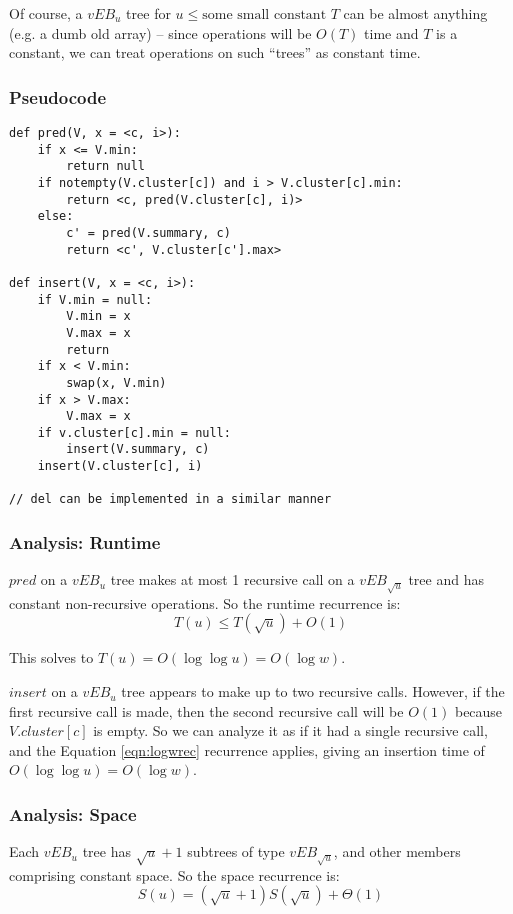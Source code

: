 \documentclass[11pt]{article}
\begin{document}
Of course, a $vEB_u$ tree for $u \leq \text{some small constant } T$ can be almost anything (e.g. a dumb old array) -- since operations will be $O(T)$ time and $T$ is a constant, we can treat operations on such ``trees'' as constant time.

\subsubsection{Pseudocode}
\small
\begin{verbatim}
def pred(V, x = <c, i>):
    if x <= V.min:
        return null
    if notempty(V.cluster[c]) and i > V.cluster[c].min:
        return <c, pred(V.cluster[c], i)>
    else:
        c' = pred(V.summary, c)
        return <c', V.cluster[c'].max>
        
def insert(V, x = <c, i>):
    if V.min = null:
        V.min = x
        V.max = x
        return
    if x < V.min:
        swap(x, V.min)
    if x > V.max:
        V.max = x
    if v.cluster[c].min = null:
        insert(V.summary, c)
    insert(V.cluster[c], i)
    
// del can be implemented in a similar manner
\end{verbatim}
\normalsize

\subsubsection{Analysis: Runtime}
$pred$ on a $vEB_u$ tree makes at most 1 recursive call on a $vEB_{\sqrt{u}}$ tree and has constant non-recursive operations. So the runtime recurrence is:
\begin{equation}
T(u) \leq T(\sqrt{u}) + O(1) \label{eqn:logwrec}
\end{equation}

This solves to $T(u) = O(\log \log u) = O(\log w)$.

$insert$ on a $vEB_u$ tree appears to make up to two recursive calls. However, if the first recursive call is made, then the second recursive call will be $O(1)$ because $V.cluster[c]$ is empty. So we can analyze it as if it had a single recursive call, and the Equation \eqref{eqn:logwrec} recurrence applies, giving an insertion time of $O(\log \log u) = O(\log w)$.

\subsubsection{Analysis: Space}
Each $vEB_u$ tree has $\sqrt{u} + 1$ subtrees of type $vEB_{\sqrt{u}}$, and other members comprising constant space. So the space recurrence is:
\begin{equation*}
S(u) = (\sqrt{u} + 1) S(\sqrt{u}) + \Theta(1)
\end{equation*}
\end{document}
